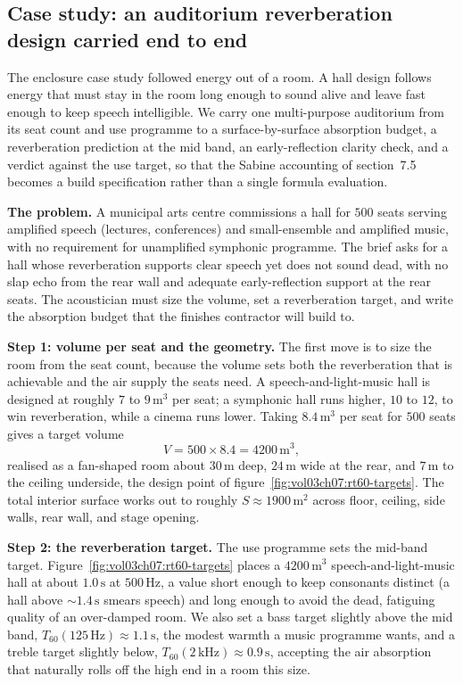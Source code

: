 \subsection{Case study: an auditorium reverberation design carried end to
end}

The enclosure case study followed energy out of a room. A hall design
follows energy that must stay in the room long enough to sound alive and
leave fast enough to keep speech intelligible. We carry one
multi-purpose auditorium from its seat count and use programme to a
surface-by-surface absorption budget, a reverberation prediction at the
mid band, an early-reflection clarity check, and a verdict against the use
target, so that the Sabine accounting of section~7.5 becomes a build
specification rather than a single formula evaluation.

\textbf{The problem.} A municipal arts centre commissions a hall for
$500$ seats serving amplified speech (lectures, conferences) and
small-ensemble and amplified music, with no requirement for unamplified
symphonic programme. The brief asks for a hall whose reverberation
supports clear speech yet does not sound dead, with no slap echo from the
rear wall and adequate early-reflection support at the rear seats. The
acoustician must size the volume, set a reverberation target, and write
the absorption budget that the finishes contractor will build to.

\textbf{Step 1: volume per seat and the geometry.} The first move is to
size the room from the seat count, because the volume sets both the
reverberation that is achievable and the air supply the seats need. A
speech-and-light-music hall is designed at roughly $7$ to
$9\,\si{\meter\cubed}$ per seat; a symphonic hall runs higher, $10$ to
$12$, to win reverberation, while a cinema runs lower. Taking
$8.4\,\si{\meter\cubed}$ per seat for $500$ seats gives a target volume
\[
V = 500\times 8.4 = 4200\,\si{\meter\cubed},
\]
realised as a fan-shaped room about $30\,\si{\meter}$ deep,
$24\,\si{\meter}$ wide at the rear, and $7\,\si{\meter}$ to the ceiling
underside, the design point of figure~\ref{fig:vol03ch07:rt60-targets}.
The total interior surface works out to roughly
$S\approx 1900\,\si{\meter\squared}$ across floor, ceiling, side walls,
rear wall, and stage opening.

\textbf{Step 2: the reverberation target.} The use programme sets the
mid-band target. Figure~\ref{fig:vol03ch07:rt60-targets} places a
$4200\,\si{\meter\cubed}$ speech-and-light-music hall at about
$1.0\,\si{\second}$ at $500\,\si{\hertz}$, a value short enough to keep
consonants distinct (a hall above $\sim 1.4\,\si{\second}$ smears speech)
and long enough to avoid the dead, fatiguing quality of an
over-damped room. We also set a bass target slightly above the mid band,
$T_{60}(125\,\si{\hertz})\approx 1.1\,\si{\second}$, the modest
warmth a music programme wants, and a treble target slightly below,
$T_{60}(2\,\si{\kilo\hertz})\approx 0.9\,\si{\second}$, accepting the air
absorption that naturally rolls off the high end in a room this size.

